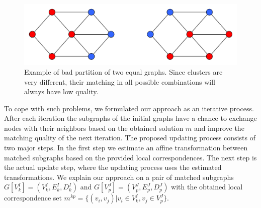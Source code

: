 \begin{figure}[h]
	\centering
	\includegraphics[scale=0.35]{chapter2/fig/badpartition.pdf}
	\caption[Example of bad partition of two equal graphs]{Example of bad partition of two equal graphs. Since clusters are very different, their matching in all possible combinations will always have low quality.} \label{fig:badpartition}
\end{figure}

To cope with such problems, we formulated our approach as an iterative process. After each iteration the subgraphs of the initial graphs have a chance to exchange nodes with their neighbors based on the obtained solution $m$ and improve the matching quality of the next iteration. The proposed updating process consists of two major steps. In the first step we estimate an affine transformation between matched subgraphs based on the provided local correspondences. The next step is the actual update step, where the updating process uses the estimated transformations.
We explain our approach on a pair of matched subgraphs $G[V^I_k]=(V^I_k, E^I_k, D^I_k)$ and $G[V^J_p]=(V^J_p, E^J_p, D^J_p)$  with the obtained local correspondence set $m^{kp}=\{(v_i,v_j)|v_i\in V^I_k, v_j\in V^J_p\}$. 

